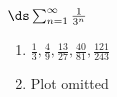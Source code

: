 {$\ds \sum_{n=1}^\infty \frac{1}{3^n}$
}
{\begin{enumerate}
\item	$\frac{1}{3},\frac{4}{9},\frac{13}{27},\frac{40}{81},\frac{121}{243}$
\item	Plot omitted
\end{enumerate}
}
